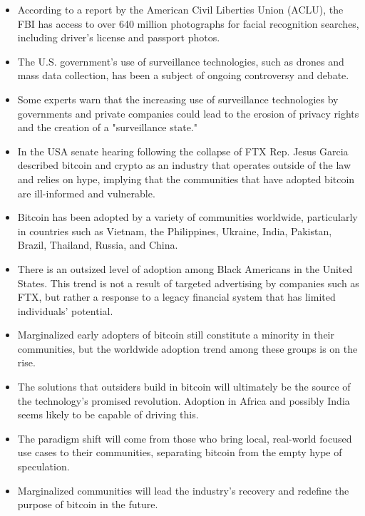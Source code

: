\begin{itemize}
\item According to a report by the American Civil Liberties Union (ACLU), the FBI has access to over 640 million photographs for facial recognition searches, including driver's license and passport photos.
\item The U.S. government's use of surveillance technologies, such as drones and mass data collection, has been a subject of ongoing controversy and debate.
\item Some experts warn that the increasing use of surveillance technologies by governments and private companies could lead to the erosion of privacy rights and the creation of a "surveillance state."
\item In the USA senate hearing following the collapse of FTX Rep. Jesus Garcia described bitcoin and crypto as an industry that operates outside of the law and relies on hype, implying that the communities that have adopted bitcoin are ill-informed and vulnerable.
\item Bitcoin has been adopted by a variety of communities worldwide, particularly in countries such as Vietnam, the Philippines, Ukraine, India, Pakistan, Brazil, Thailand, Russia, and China.
\item There is an outsized level of adoption among Black Americans in the United States. This trend is not a result of targeted advertising by companies such as FTX, but rather a response to a legacy financial system that has limited individuals' potential.
\item Marginalized early adopters of bitcoin still constitute a minority in their communities, but the worldwide adoption trend among these groups is on the rise.
\item The solutions that outsiders build in bitcoin will ultimately be the source of the technology's promised revolution. Adoption in Africa and possibly India seems likely to be capable of driving this.
\item The paradigm shift will come from those who bring local, real-world focused use cases to their communities, separating bitcoin from the empty hype of speculation.
\item Marginalized communities will lead the industry's recovery and redefine the purpose of bitcoin in the future.
\end{itemize} 

